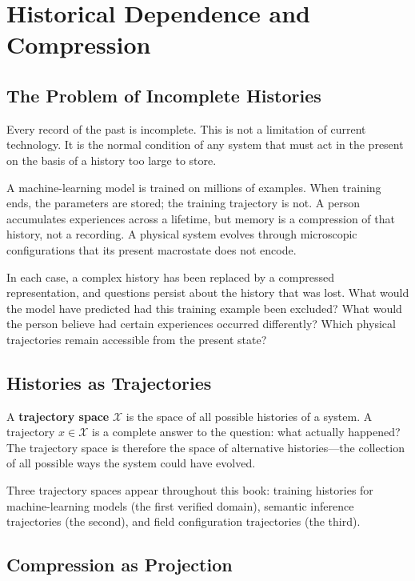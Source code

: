 \chapter{Historical Dependence and Compression}

\section{The Problem of Incomplete Histories}

Every record of the past is incomplete. This is not a limitation of current technology. It is the normal condition of any system that must act in the present on the basis of a history too large to store.

A machine-learning model is trained on millions of examples. When training ends, the parameters are stored; the training trajectory is not. A person accumulates experiences across a lifetime, but memory is a compression of that history, not a recording. A physical system evolves through microscopic configurations that its present macrostate does not encode.

In each case, a complex history has been replaced by a compressed representation, and questions persist about the history that was lost. What would the model have predicted had this training example been excluded? What would the person believe had certain experiences occurred differently? Which physical trajectories remain accessible from the present state?

\section{Histories as Trajectories}

A \textbf{trajectory space} $\mathcal{X}$ is the space of all possible histories of a system. A trajectory $x \in \mathcal{X}$ is a complete answer to the question: what actually happened? The trajectory space is therefore the space of alternative histories---the collection of all possible ways the system could have evolved.

Three trajectory spaces appear throughout this book: training histories for machine-learning models (the first verified domain), semantic inference trajectories (the second), and field configuration trajectories (the third).

\section{Compression as Projection}


